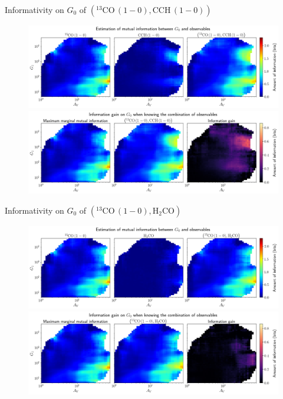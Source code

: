 \documentclass{beamer}
\begin{document}
\begin{frame}{Informativity on $G_0$ of $\left(\mathrm{^{13}CO\,(1-0)},\mathrm{CCH\,(1-0)}\right)$}
    \begin{figure}
        \centering
        \includegraphics[width=0.95\linewidth]{../mi/g0__13co10_cch10_mi.png}
        \vfill
        \includegraphics[width=0.95\linewidth]{../mi/g0__13co10_cch10_mi_gain.png}
    \end{figure}
\end{frame}

\begin{frame}{Informativity on $G_0$ of $\left(\mathrm{^{13}CO\,(1-0)},\mathrm{H_2CO}\right)$}
    \begin{figure}
        \centering
        \includegraphics[width=0.95\linewidth]{../mi/g0__13co10_h2co_mi.png}
        \vfill
        \includegraphics[width=0.95\linewidth]{../mi/g0__13co10_h2co_mi_gain.png}
    \end{figure}
\end{frame}
\end{document}
